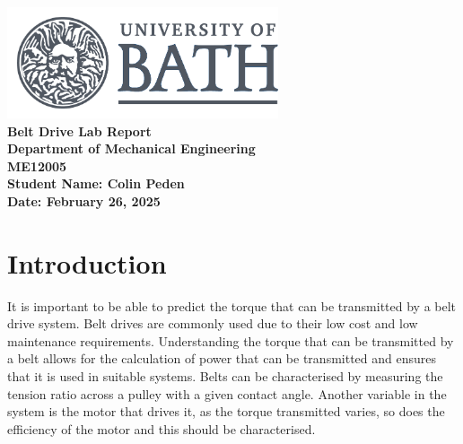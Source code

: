 \documentclass[a4paper,12pt]{article}
\begin{document}
\pagestyle{fancy}  
\fancyhf{}  


\doublespacing  

\setlength{\headheight}{16pt}       
\addtolength{\topmargin}{-4pt}     



\fancyfoot[R]{\thepage}

\begin{titlepage}
  \thispagestyle{empty}
  \centering
  \includegraphics[width=0.6\textwidth]{uob-logo-grey-transparent-1.png} \\[2cm]
  {\Huge\textbf{Belt Drive Lab Report}} \\[1.5cm]
  {\LARGE\textbf{Department of Mechanical Engineering}} \\[0.5cm]
  {\LARGE\textbf{ME12005}} \\[1cm]
  {\Large\textbf{Student Name: Colin Peden}} \\[0.5cm]
  {\Large\textbf{Date: February 26, 2025}} \\[2cm]
  \vfill
\end{titlepage}

\begin{abstract}

\end{abstract}


\section{Introduction}
It is important to be able to predict the torque that can be transmitted by a belt drive system. Belt drives are commonly used due to their low cost and low maintenance requirements. Understanding the torque that can be transmitted by a belt allows for the calculation of power that can be transmitted and ensures that it is used in suitable systems. Belts can be characterised by measuring the tension ratio across a pulley with a given contact angle. Another variable in the system is the motor that drives it, as the torque transmitted varies, so does the efficiency of the motor and this should be characterised.
\end{document}
